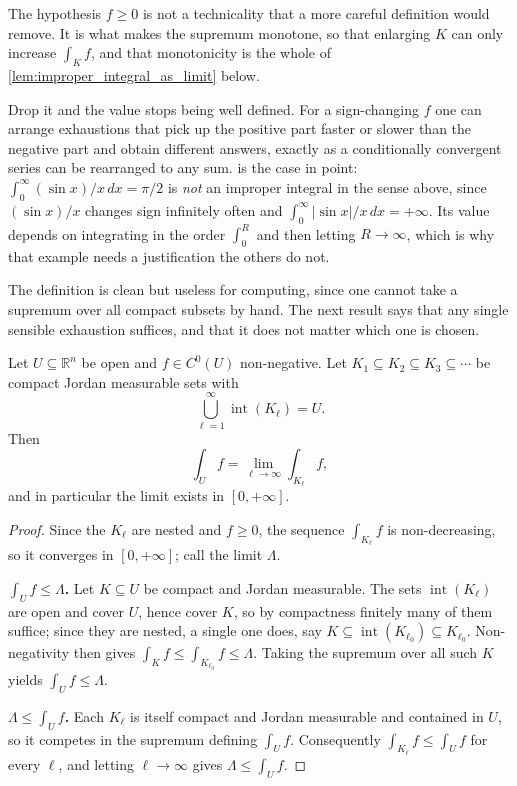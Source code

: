 \begin{remark}
\label{rem:improper_needs_nonnegativity}
The hypothesis $f \geq 0$ is not a technicality that a more careful definition would remove. It
is what makes the supremum monotone, so that enlarging $K$ can only increase $\int_K f$, and
that monotonicity is the whole of \cref{lem:improper_integral_as_limit} below.

Drop it and the value stops being well defined. For a sign-changing $f$ one can arrange
exhaustions that pick up the positive part faster or slower than the negative part and obtain
different answers, exactly as a conditionally convergent series can be rearranged to any sum.
 is the case in point: $\int_0^\infty (\sin x)/x\,dx = \pi/2$
is \emph{not} an improper integral in the sense above, since $(\sin x)/x$ changes sign infinitely
often and $\int_0^\infty \lvert\sin x\rvert/x\,dx = +\infty$. Its value depends on integrating in
the order $\int_0^R$ and then letting $R \to \infty$, which is why that example needs a
justification the others do not.
\end{remark}

The definition is clean but useless for computing, since one cannot take a supremum over all
compact subsets by hand. The next result says that any single sensible exhaustion suffices, and
that it does not matter which one is chosen.

\begin{lemma}
\label{lem:improper_integral_as_limit}
Let $U \subseteq \mathbb{R}^n$ be open and $f \in C^0(U)$ non-negative. Let
$K_1 \subseteq K_2 \subseteq K_3 \subseteq \cdots$ be compact Jordan measurable sets with
\[\bigcup_{\ell=1}^\infty \operatorname{int}(K_\ell) = U.\]
Then
\[\int_U f = \lim_{\ell\to\infty}\int_{K_\ell} f,\]
and in particular the limit exists in $[0,+\infty]$.
\end{lemma}

\begin{proof}
Since the $K_\ell$ are nested and $f \geq 0$, the sequence $\int_{K_\ell}f$ is non-decreasing, so
it converges in $[0,+\infty]$; call the limit $\Lambda$.

\textbf{$\int_U f \leq \Lambda$.} Let $K \subseteq U$ be compact and Jordan measurable. The sets
$\operatorname{int}(K_\ell)$ are open and cover $U$, hence cover $K$, so by compactness finitely
many of them suffice; since they are nested, a single one does, say
$K \subseteq \operatorname{int}(K_{\ell_0}) \subseteq K_{\ell_0}$. Non-negativity then gives
$\int_K f \leq \int_{K_{\ell_0}} f \leq \Lambda$. Taking the supremum over all such $K$ yields
$\int_U f \leq \Lambda$.

\textbf{$\Lambda \leq \int_U f$.} Each $K_\ell$ is itself compact and Jordan measurable and
contained in $U$, so it competes in the supremum defining $\int_U f$. Consequently
$\int_{K_\ell} f \leq \int_U f$ for every $\ell$, and letting $\ell \to \infty$ gives
$\Lambda \leq \int_U f$.
\end{proof}

